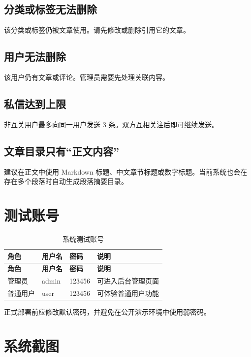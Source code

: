 \documentclass[UTF8,a4paper,12pt]{ctexart}
\begin{document}
\subsection{分类或标签无法删除}

该分类或标签仍被文章使用。请先修改或删除引用它的文章。

\subsection{用户无法删除}

该用户仍有文章或评论。管理员需要先处理关联内容。

\subsection{私信达到上限}

非互关用户最多向同一用户发送 3 条。双方互相关注后即可继续发送。

\subsection{文章目录只有“正文内容”}

建议在正文中使用 Markdown 标题、中文章节标题或数字标题。当前系统也会在存在多个段落时自动生成段落摘要目录。

\section{测试账号}

\begin{longtable}{p{2.8cm}p{3.4cm}p{3.4cm}p{3.6cm}}
\caption{系统测试账号}\\
\toprule
\rowcolor{tablehead}\textbf{角色} & \textbf{用户名} & \textbf{密码} & \textbf{说明}\\
\midrule
\endfirsthead
\toprule
\rowcolor{tablehead}\textbf{角色} & \textbf{用户名} & \textbf{密码} & \textbf{说明}\\
\midrule
\endhead
管理员 & admin & 123456 & 可进入后台管理页面\\
普通用户 & user & 123456 & 可体验普通用户功能\\
\bottomrule
\end{longtable}

正式部署前应修改默认密码，并避免在公开演示环境中使用弱密码。

\section{系统截图}
\end{document}
